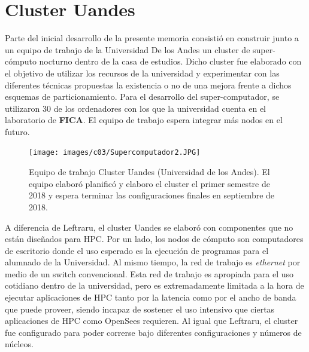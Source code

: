 
\chapter{Cluster Uandes}
\label{uandes_cluster}

Parte del inicial desarrollo de la presente memoria consistió en construir junto a un equipo de trabajo de la Universidad De los Andes un cluster de super-cómputo nocturno dentro de la casa de estudios. Dicho cluster fue elaborado con el objetivo de utilizar los recursos de la universidad y experimentar con las diferentes técnicas propuestas la existencia o no de una mejora frente a dichos esquemas de particionamiento. Para el desarrollo del super-computador, se utilizaron 30 de los ordenadores con los que la universidad cuenta en el laboratorio de \textbf{FICA}. El equipo de trabajo espera integrar más nodos en el futuro.

\begin{figure}[H]
\begin{center}
   \texttt{[image: images/c03/Supercomputador2.JPG]}
\end{center}

\caption[Equipo de trabajo Cluster Uandes]{Equipo de trabajo Cluster Uandes (Universidad de los Andes)\footnotemark{}. El equipo elaboró planificó y elaboro el cluster el primer semestre de 2018 y espera terminar las configuraciones finales en septiembre de 2018.}
\label{c03_cluster_uandes_team} %
\end{figure}

A diferencia de Leftraru, el cluster Uandes se elaboró con componentes que no están diseñados para HPC. Por un lado, los nodos de cómputo son computadores de escritorio donde el uso esperado es la ejecución de programas para el alumnado de la Universidad. Al mismo tiempo, la red de trabajo es \textit{ethernet} por medio de un switch convencional. Esta red de trabajo es apropiada para el uso cotidiano dentro de la universidad, pero es extremadamente limitada a la hora de ejecutar aplicaciones de HPC tanto por la latencia como por el ancho de banda que puede proveer, siendo incapaz de sostener el uso intensivo que ciertas aplicaciones de HPC como OpenSees requieren. Al igual que Leftraru, el cluster fue configurado para poder correrse bajo diferentes configuraciones y números de núcleos.


